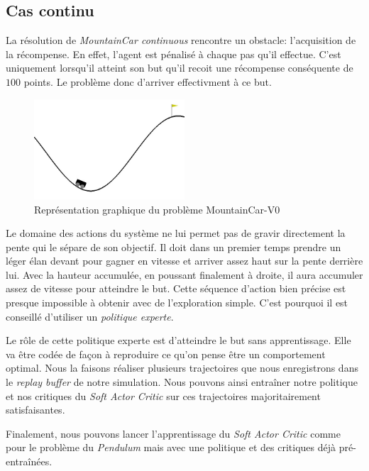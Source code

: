 \subsection{Cas continu}

La résolution de \emph{MountainCar continuous} rencontre un obstacle:
l'acquisition de la récompense. En effet, l'agent est pénalisé à chaque pas qu'il effectue. C'est uniquement lorsqu'il atteint son but qu'il recoit une récompense conséquente de \(100\) points. Le problème donc d'arriver effectivment à ce but.

\begin{figure}[htb]
    \centering
    \includegraphics[width=0.5\textwidth]{figures/mountain_car/env.jpeg}
    \caption{Représentation graphique du problème MountainCar-V0}
    \label{fig:mountain_car_continuous}
\end{figure}

Le domaine des actions du système ne lui permet pas de gravir directement la pente qui le sépare de son objectif. Il doit dans un premier temps prendre un léger élan devant pour gagner en vitesse et arriver assez haut sur la pente derrière lui. Avec la hauteur accumulée, en poussant finalement à droite, il aura accumuler assez de vitesse pour atteindre le but. Cette séquence d'action bien précise est presque impossible à obtenir avec de l'exploration simple. C'est pourquoi il est conseillé d'utiliser un \emph{politique experte}. 

Le rôle de cette politique experte est d'atteindre le but sans apprentissage. Elle va être codée de façon à reproduire ce qu'on pense être un comportement optimal. Nous la faisons réaliser plusieurs trajectoires que nous enregistrons dans le \emph{replay buffer} de notre simulation. Nous pouvons ainsi entraîner notre politique et nos critiques du \emph{Soft Actor Critic} sur ces trajectoires majoritairement satisfaisantes.

Finalement, nous pouvons lancer l'apprentissage du \emph{Soft Actor Critic} comme pour le problème du \emph{Pendulum} mais avec une politique et des critiques déjà pré-entraînées.

